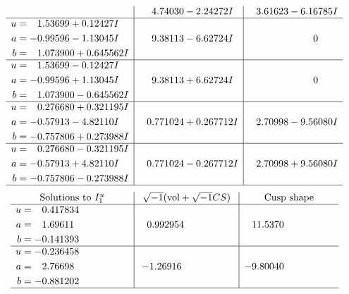 \documentclass[1p]{elsarticle_modified}
\theoremstyle{definition}
\newcommand{\I}{\sqrt{-1}}
\begin{document}
$$\begin{array}{c|c|c}
 & \phantom{-}4.74030 - 2.24272 I & \phantom{-}3.61623 - 6.16785 I \\ \hline\begin{aligned}
u &= \phantom{-}1.53699 + 0.12427 I \\
a &= -0.99596 - 1.13045 I \\
b &= \phantom{-}1.073900 + 0.645562 I\end{aligned}
 & \phantom{-}9.38113 - 6.62724 I & \phantom{-0.000000 } 0 \\ \hline\begin{aligned}
u &= \phantom{-}1.53699 - 0.12427 I \\
a &= -0.99596 + 1.13045 I \\
b &= \phantom{-}1.073900 - 0.645562 I\end{aligned}
 & \phantom{-}9.38113 + 6.62724 I & \phantom{-0.000000 } 0 \\ \hline\begin{aligned}
u &= \phantom{-}0.276680 + 0.321195 I \\
a &= -0.57913 - 4.82110 I \\
b &= -0.757806 + 0.273988 I\end{aligned}
 & \phantom{-}0.771024 + 0.267712 I & \phantom{-}2.70998 - 9.56080 I \\ \hline\begin{aligned}
u &= \phantom{-}0.276680 - 0.321195 I \\
a &= -0.57913 + 4.82110 I \\
b &= -0.757806 - 0.273988 I\end{aligned}
 & \phantom{-}0.771024 - 0.267712 I & \phantom{-}2.70998 + 9.56080 I\\
 \hline 
 \end{array}$$\newpage$$\begin{array}{c|c|c}  
\text{Solutions to }I^u_{1}& \I (\text{vol} + \sqrt{-1}CS) & \text{Cusp shape}\\
 \hline 
\begin{aligned}
u &= \phantom{-}0.417834\phantom{ +0.000000I} \\
a &= \phantom{-}1.69611\phantom{ +0.000000I} \\
b &= -0.141393\phantom{ +0.000000I}\end{aligned}
 & \phantom{-}0.992954\phantom{ +0.000000I} & \phantom{-}11.5370\phantom{ +0.000000I} \\ \hline\begin{aligned}
u &= -0.236458\phantom{ +0.000000I} \\
a &= \phantom{-}2.76698\phantom{ +0.000000I} \\
b &= -0.881202\phantom{ +0.000000I}\end{aligned}
 & -1.26916\phantom{ +0.000000I} & -9.80040\phantom{ +0.000000I}\\
 \hline 
 \end{array}$$\newpage\newpage\renewcommand{\arraystretch}{1}
\end{document}
